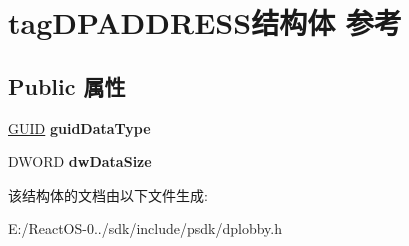 \hypertarget{structtag_d_p_a_d_d_r_e_s_s}{}\section{tag\+D\+P\+A\+D\+D\+R\+E\+S\+S结构体 参考}
\label{structtag_d_p_a_d_d_r_e_s_s}
\subsection*{Public 属性}
\begin{DoxyCompactItemize}
\item 
\mbox{\label{structtag_d_p_a_d_d_r_e_s_s_a347c531c983669f32b8c97c2394cf210}} 
\hyperlink{interface_g_u_i_d}{G\+U\+ID} {\bfseries guid\+Data\+Type}
\item 
\mbox{\label{structtag_d_p_a_d_d_r_e_s_s_aba1d3395f19a94cfded1109c880796c4}} 
D\+W\+O\+RD {\bfseries dw\+Data\+Size}
\end{DoxyCompactItemize}


该结构体的文档由以下文件生成\+:\begin{DoxyCompactItemize}
\item 
E\+:/\+React\+O\+S-\/0../sdk/include/psdk/dplobby.\+h\end{DoxyCompactItemize}
